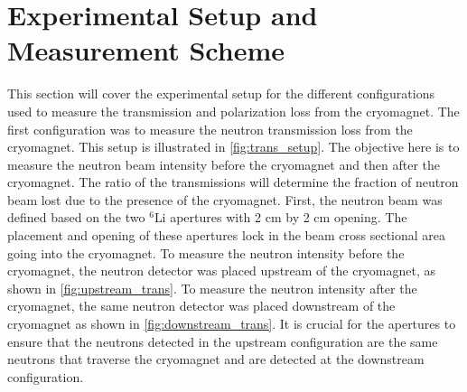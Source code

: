 \section{Experimental Setup and Measurement Scheme}

This section will cover the experimental setup for the different configurations used to measure the transmission and polarization loss from the cryomagnet. The first configuration was to measure the neutron transmission loss from the cryomagnet. This setup is illustrated in \cref{fig:trans_setup}. The objective here is to measure the neutron beam intensity before the cryomagnet and then after the cryomagnet. The ratio of the transmissions will determine the fraction of neutron beam lost due to the presence of the cryomagnet. First, the neutron beam was defined based on the two $^6$Li apertures with 2 cm by 2 cm opening. The placement and opening of these apertures lock in the beam cross sectional area going into the cryomagnet. To measure the neutron intensity before the cryomagnet, the neutron detector was placed upstream of the cryomagnet, as shown in \cref{fig:upstream_trans}. To measure the neutron intensity after the cryomagnet, the same neutron detector was placed downstream of the cryomagnet as shown in \cref{fig:downstream_trans}. It is crucial for the apertures to ensure that the neutrons detected in the upstream configuration are the same neutrons that traverse the cryomagnet and are detected at the downstream configuration.

